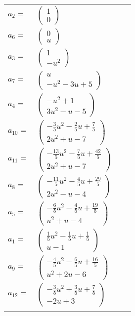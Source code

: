 \documentclass[1p]{elsarticle_modified}
\theoremstyle{definition}
\begin{document}
\begin{tabular}{m{7pt} m{180pt} m{7pt} m{180pt} }
\flushright $a_{2}=$&$\begin{pmatrix}1\\0\end{pmatrix}$ \\
\flushright $a_{6}=$&$\begin{pmatrix}0\\u\end{pmatrix}$ \\
\flushright $a_{3}=$&$\begin{pmatrix}1\\- u^2\end{pmatrix}$ \\
\flushright $a_{7}=$&$\begin{pmatrix}u\\- u^2-3 u+5\end{pmatrix}$ \\
\flushright $a_{4}=$&$\begin{pmatrix}- u^2+1\\3 u^2- u-5\end{pmatrix}$ \\
\flushright $a_{10}=$&$\begin{pmatrix}-\frac{3}{5} u^2-\frac{2}{5} u+\frac{7}{5}\\2 u^2+u-7\end{pmatrix}$ \\
\flushright $a_{11}=$&$\begin{pmatrix}-\frac{13}{5} u^2-\frac{7}{5} u+\frac{42}{5}\\2 u^2+u-7\end{pmatrix}$ \\
\flushright $a_{8}=$&$\begin{pmatrix}-\frac{11}{5} u^2-\frac{4}{5} u+\frac{29}{5}\\2 u^2- u-4\end{pmatrix}$ \\
\flushright $a_{5}=$&$\begin{pmatrix}-\frac{6}{5} u^2-\frac{4}{5} u+\frac{19}{5}\\u^2+u-4\end{pmatrix}$ \\
\flushright $a_{1}=$&$\begin{pmatrix}\frac{1}{5} u^2-\frac{1}{5} u+\frac{1}{5}\\u-1\end{pmatrix}$ \\
\flushright $a_{9}=$&$\begin{pmatrix}-\frac{4}{5} u^2-\frac{6}{5} u+\frac{16}{5}\\u^2+2 u-6\end{pmatrix}$ \\
\flushright $a_{12}=$&$\begin{pmatrix}-\frac{3}{5} u^2+\frac{3}{5} u+\frac{7}{5}\\-2 u+3\end{pmatrix}$\\&\end{tabular}
\end{document}

